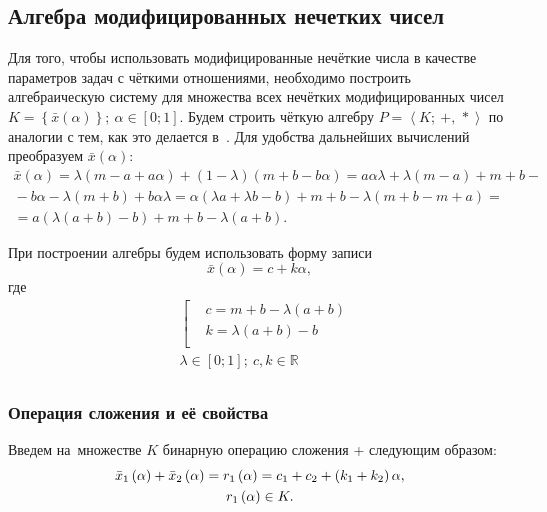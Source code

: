\subsection{Алгебра модифицированных нечетких чисел}
Для того, чтобы использовать модифицированные нечёткие числа в качестве параметров задач с чёткими отношениями, необходимо построить алгебраическую систему для множества всех нечётких модифицированных чисел $K=\left\{ \bar{x}\left( \alpha  \right) \right\};\ \alpha \in \left[ 0;1 \right]$. Будем строить чёткую алгебру $P=\left\langle K ;\ +,\,* \right\rangle$ по аналогии с тем, как это делается в~\cite{Yakhyaeva}. Для удобства дальнейших вычислений преобразуем $\bar{x}\left( \alpha \right)$:
\begin{gather*}
  \bar{x}\left( \alpha  \right)=\lambda \left( m-a+a\alpha  \right)+\left( 1-\lambda  \right)\left( m+b-b\alpha  \right)=a\alpha \lambda +\lambda \left( m-a \right)+m+b-{}\\
  {}-b\alpha -\lambda \left( m+b \right)+b\alpha \lambda =\alpha \left( \lambda a+\lambda b-b \right)+m+b-\lambda \left( m+b-m+a \right)={}\\
  {}=a\left( \lambda \left( a+b \right)-b \right)+m+b-\lambda \left( a+b \right).
\end{gather*}

При построении алгебры будем использовать форму записи
\begin{equation}
\label{eq:modified-number-base}
  \bar{x}\left( \alpha  \right)=c+k\alpha,
\end{equation}
где
\begin{equation}
\label{eq:modified-number-from-abm}
  \begin{aligned}
    & \left[ \begin{aligned}
    & c=m+b-\lambda \left( a+b \right) \\ 
    & k=\lambda \left( a+b \right)-b \\ 
  \end{aligned} \right. \\ 
  & \lambda \in \left[ 0;1 \right];\ c,k\in \mathbb{R} \\ 
\end{aligned}
\end{equation}

\subsubsection*{Операция сложения и её свойства}

Введем на~множестве $K$ бинарную операцию сложения + следующим образом:
\begin{gather*}
  \bar{x}_1\left(\alpha \right)+\bar{x}_2\left(\alpha \right)=r_1\left( \alpha  \right)=c_1+c_2+\left(k_1+k_2 \right)\alpha, \notag \\ 
  r_1\left( \alpha  \right)\in K.
\end{gather*}

